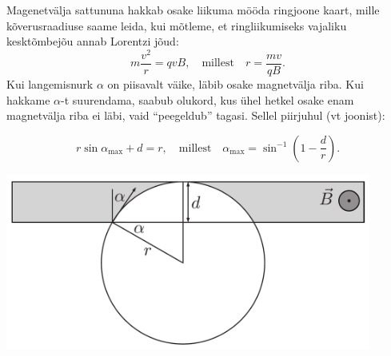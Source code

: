\solu
Magenetvälja sattununa hakkab osake liikuma mööda ringjoone kaart, mille kõverusraadiuse saame leida, kui mõtleme, et ringliikumiseks vajaliku kesktõmbejõu annab Lorentzi jõud:
\[m\frac{v^2}{r}=qvB, \quad \text{millest} \quad r=\frac{mv}{qB}.\]
Kui langemisnurk $\alpha$ on piisavalt väike, läbib osake magnetvälja riba. Kui hakkame $\alpha$-t
suurendama, saabub olukord, kus ühel hetkel osake enam magnetvälja riba ei läbi, vaid ``peegeldub'' tagasi. Sellel piirjuhul (vt joonist):

\[r\sin\alpha_\text{max}+d=r, \quad \text{millest} \quad \alpha_\text{max}=\sin^{-1}\left(1-\frac{d}{r}\right).\]

\begin{center}
\includegraphics[width=0.9\textwidth]{2013-lahg-02-magPeegLah.pdf}
\end{center}

